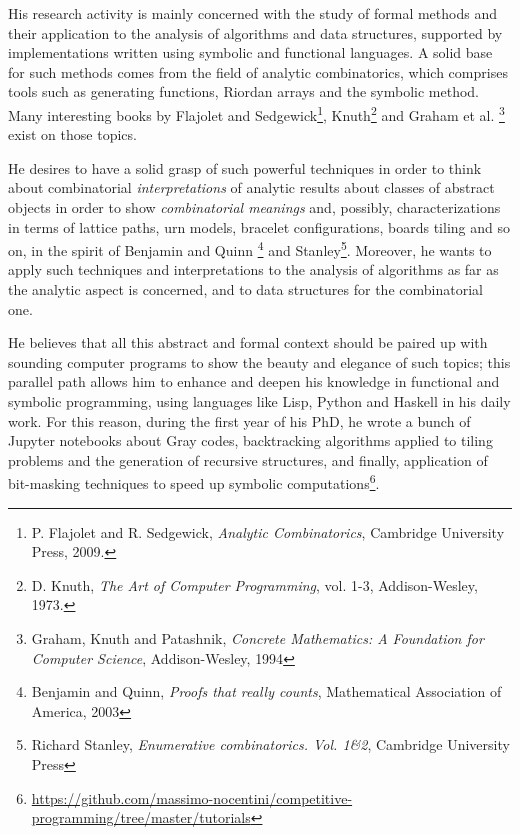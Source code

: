 \documentclass[a4paper]{tufte-handout}
\begin{document}
    His research activity is mainly concerned with the study of 
    formal methods and their application to the analysis of algorithms and data structures, 
    supported by implementations written using symbolic and functional languages.
    A solid base for such methods comes from the field of analytic combinatorics, 
    which comprises tools such as generating functions, Riordan arrays and the symbolic method. Many
    interesting books by Flajolet and Sedgewick\footnote{P. Flajolet and R.
    Sedgewick, \emph{Analytic Combinatorics}, Cambridge University Press, 2009.},
    Knuth\footnote{D. Knuth, \emph{The Art of Computer Programming}, vol.  1-3,
    Addison-Wesley, 1973.} and Graham et al. \footnote{Graham, Knuth and Patashnik,
    \emph{Concrete Mathematics: A Foundation for Computer Science}, Addison-Wesley,
    1994} exist on those topics. 


    He desires to have a solid grasp of such powerful techniques in order to
    think about combinatorial \emph{interpretations} of
    analytic results about classes of abstract objects in order to show
    \emph{combinatorial meanings} and, possibly, characterizations in terms
    of lattice paths, urn models, bracelet configurations, boards
    tiling and so on, in the spirit of Benjamin and Quinn \footnote{Benjamin
    and Quinn, \emph{Proofs that really counts}, Mathematical Association of
    America, 2003} and Stanley\footnote{Richard Stanley, \emph{Enumerative
    combinatorics. {V}ol. 1\&2}, Cambridge University Press}. Moreover, he wants
    to apply such techniques and interpretations to the analysis of algorithms
    as far as the analytic aspect is concerned, and to data structures for the
    combinatorial one. 

    He believes that all this abstract and formal context should be paired up with
    sounding computer programs to show the beauty and elegance of such topics;
    this parallel path allows him to enhance and deepen his knowledge in functional
    and symbolic programming, using languages like Lisp, Python and Haskell in his daily work.
    For this reason, during the first year of his PhD, he wrote a bunch of Jupyter 
    notebooks about Gray codes, backtracking algorithms applied to tiling problems
    and the generation of recursive structures, and finally, application
    of bit-masking techniques to speed up symbolic computations\footnote{\url{https://github.com/massimo-nocentini/competitive-programming/tree/master/tutorials}}.
\end{document}
